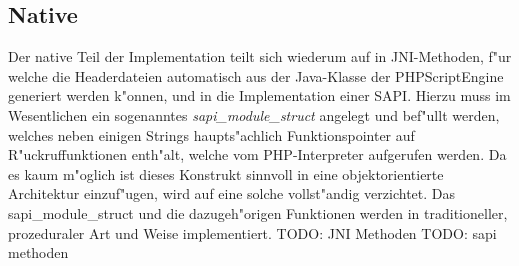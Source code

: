 \subsection{Native}
\label{sec:chap1:design:native}

Der native Teil der Implementation teilt sich wiederum auf in JNI-Methoden, f"ur welche die Headerdateien automatisch aus
der Java-Klasse der PHPScriptEngine generiert werden k"onnen, und in die Implementation einer SAPI. Hierzu muss im
Wesentlichen ein sogenanntes \emph{sapi\_module\_struct} angelegt und bef"ullt werden, welches neben einigen Strings
haupts"achlich Funktionspointer auf R"uckruffunktionen enth"alt, welche vom PHP-Interpreter aufgerufen werden. Da es
kaum m"oglich ist dieses Konstrukt sinnvoll in eine objektorientierte Architektur einzuf"ugen, wird auf eine solche
vollst"andig verzichtet. Das sapi\_module\_struct und die dazugeh"origen Funktionen werden in traditioneller,
prozeduraler Art und Weise implementiert.
TODO: JNI Methoden
TODO: sapi methoden






